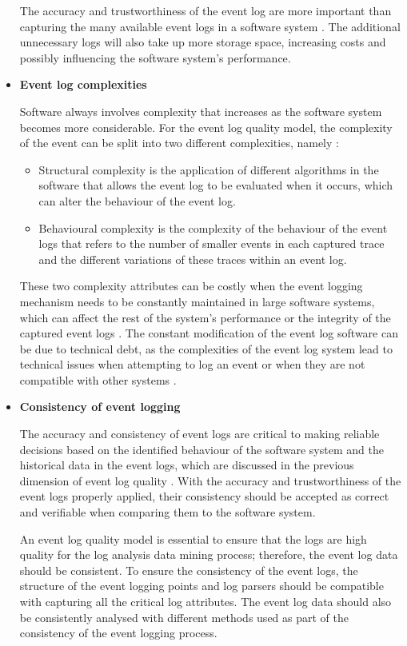 \begin{itemize}
	The accuracy and trustworthiness of the event log are more important than capturing the many available event logs in a software system \cite{Zhu2015, Jans2012}. The additional unnecessary logs will also take up more storage space, increasing costs and possibly influencing the software system's performance.
	
	\clearpage

	\item \textbf{Event log complexities}\par Software always involves complexity that increases as the software system becomes more considerable. For the event log quality model, the complexity of the event can be split into two different complexities, namely \cite{Kherbouche2017}:

	\begin{itemize}
		\item Structural complexity is the application of different algorithms in the software that allows the event log to be evaluated when it occurs, which can alter the behaviour of the event log.
		\item Behavioural complexity is the complexity of the behaviour of the event logs that refers to the number of smaller events in each captured trace and the different variations of these traces within an event log.
	\end{itemize}

	These two complexity attributes can be costly when the event logging mechanism needs to be constantly maintained in large software systems, which can affect the rest of the system’s performance or the integrity of the captured event logs \cite{Ogheneovo2014}. The constant modification of the event log software can be due to technical debt, as the complexities of the event log system lead to technical issues when attempting to log an event or when they are not compatible with other systems \cite{DeLeon-Sigg2020}.  

 	\item \textbf{Consistency of event logging}\par The accuracy and consistency of event logs are critical to making reliable decisions based on the identified behaviour of the software system and the historical data in the event logs, which are discussed in the previous dimension of event log quality \cite{Stojanov2017, Kherbouche2017}. With the accuracy and trustworthiness of the event logs properly applied, their consistency should be accepted as correct and verifiable when comparing them to the software system. \par An event log quality model is essential to ensure that the logs are high quality for the log analysis data mining process; therefore, the event log data should be consistent. To ensure the consistency of the event logs, the structure of the event logging points and log parsers should be compatible with capturing all the critical log attributes. The event log data should also be consistently analysed with different methods used as part of the consistency of the event logging process.


\end{itemize}
